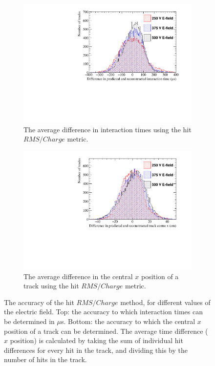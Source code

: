 \begin{figure}
  \centering
  \begin{subfigure}{0.6\textwidth}
    \centering
    \includegraphics[width=\textwidth]{Canvas_AvDiff_T_RMS_Q_ElecField}
    \caption{The average difference in interaction times using the hit $RMS/Charge$ metric.}
    \label{fig:DiffElecStudy_AvDiff_RMS_Int_T}
  \end{subfigure}
  \begin{subfigure}{0.6\textwidth}
    \centering
    \includegraphics[width=\textwidth]{Canvas_AvDiff_X_RMS_Q_ElecField}
    \caption{The average difference in the central $x$ position of a track using the hit $RMS/Charge$ metric.}
    \label{fig:DiffElecStudy_AvDiff_RMS_Int_X}
  \end{subfigure}
  \caption[Comparing the accuracy of the hit $RMS$ method, as the electric field changes]
          {The accuracy of the hit $RMS/Charge$ method, for different values of the electric field. Top: the accuracy to which interaction times can be determined in $\mu$s. Bottom: the accuracy to which the central $x$ position of a track can be determined. The average time difference ($x$ position) is calculated by taking the sum of individual hit differences for every hit in the track, and dividing this by the number of hits in the track.}
  \label{fig:DiffElecStudy_AvDiff_RMS_Int}
\end{figure}


